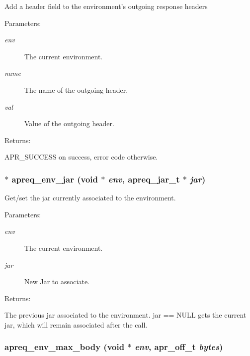 Add a header field to the environment's outgoing response headers \begin{Desc}
\item[Parameters: ]\par
\begin{description}
\item[{\em 
env}]The current environment. \item[{\em 
name}]The name of the outgoing header. \item[{\em 
val}]Value of the outgoing header. \end{description}
\end{Desc}
\begin{Desc}
\item[Returns: ]\par
APR\_\-SUCCESS on success, error code otherwise. \end{Desc}
\subsubsection{$\ast$ apreq\_\-env\_\-jar ({\bf void} $\ast$ {\em env}, {\bf apreq\_\-jar\_\-t} $\ast$ {\em jar})}\label{group__ENV_a3}


Get/set the jar currently associated to the environment. \begin{Desc}
\item[Parameters: ]\par
\begin{description}
\item[{\em 
env}]The current environment. \item[{\em 
jar}]New Jar to associate. \end{description}
\end{Desc}
\begin{Desc}
\item[Returns: ]\par
The previous jar associated to the environment. jar == NULL gets the current jar, which will remain associated after the call. \end{Desc}
\subsubsection{ apreq\_\-env\_\-max\_\-body ({\bf void} $\ast$ {\em env}, {\bf apr\_\-off\_\-t} {\em bytes})}\label{group__ENV_a10}


